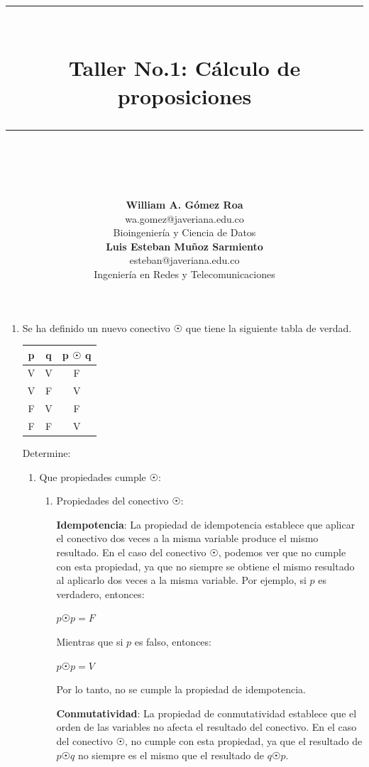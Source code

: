 \documentclass{article}
\title{\hrule height 5pt \\[2ex]\LARGE\bfseries Taller No.1: Cálculo de proposiciones\\[2ex] \hrule height 1.3pt \\[2ex]\LARGE }
\author{%
  \begin{minipage}[t]{0.25\textwidth}
    \centering
    \textbf{William A. Gómez Roa} \\wa.gomez@javeriana.edu.co \\ Bioingeniería y Ciencia de Datos
  \end{minipage}%
  \begin{minipage}[t]{0.25\textwidth}
    \centering
    \textbf{Luis Esteban Muñoz Sarmiento} \\ esteban@javeriana.edu.co \\ Ingeniería en Redes y Telecomunicaciones
  \end{minipage}%
}
\date{}
\begin{document}
\maketitle



\begin{enumerate}
  \item Se ha definido un nuevo conectivo $\astrosun$ que tiene la siguiente tabla de verdad.

 \begin{tabular}{|c|c|c|}
  \hline
  p & q & p $\astrosun$ q \\
  \hline
  V & V & F \\
  \hline
  V & F & V \\
  \hline
   F & V & F \\
  \hline
  F & F & V \\
  \hline
\end{tabular}

Determine:
\begin{enumerate}[label=(\alph*)]
    \item Que propiedades cumple $\astrosun$:

\begin{enumerate}[label=(\alph*)]
  \item Propiedades del conectivo $\astrosun$:

  \textbf{Idempotencia}: La propiedad de idempotencia establece que aplicar el conectivo dos veces a la misma variable produce el mismo resultado. En el caso del conectivo $\astrosun$, podemos ver que no cumple con esta propiedad, ya que no siempre se obtiene el mismo resultado al aplicarlo dos veces a la misma variable. Por ejemplo, si $p$ es verdadero, entonces:

  $ p \astrosun p = F$

  Mientras que si $p$ es falso, entonces:

  $ p \astrosun p = V$

  Por lo tanto, no se cumple la propiedad de idempotencia.

  \textbf{Conmutatividad}: La propiedad de conmutatividad establece que el orden de las variables no afecta el resultado del conectivo. En el caso del conectivo $\astrosun$, no cumple con esta propiedad, ya que el resultado de $p \astrosun q$ no siempre es el mismo que el resultado de $q \astrosun p$.


\end{enumerate}
\end{enumerate}
\end{enumerate}
\end{document}
